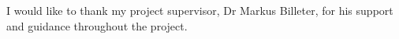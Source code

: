 I would like to thank my project supervisor, Dr Markus Billeter, for his support and guidance throughout the project.
